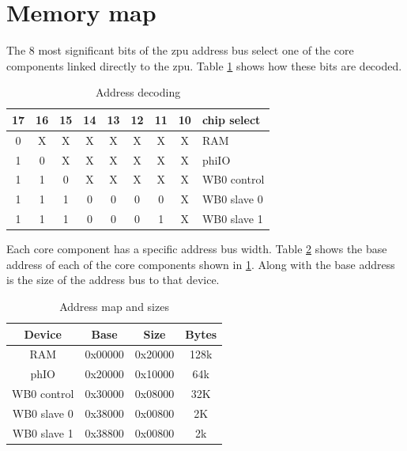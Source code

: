 \documentclass[a4paper,twocolumn,12pt]{article}
\begin{document}
\section{Memory map}

The 8 most significant bits of the zpu address bus select one of the core components linked directly to the zpu. Table \ref{tab:address_bits} shows how these bits are decoded.

\begin{table}[h]
\caption{Address decoding}
\label{tab:address_bits}
\begin{tabular}{| c | c | c | c | c | c | c | c | l |
}
    \hline
    17 & 16 & 15 & 14 & 13 & 12 & 11 & 10 & chip select \\ \hline
    0  & X  & X  & X  & X  & X  & X  & X  & RAM \\ \hline
    1  & 0  & X  & X  & X  & X  & X  & X  & phiIO \\ \hline
    1  & 1  & 0  & X  & X  & X  & X  & X  & WB0 control \\ \hline
    1  & 1  & 1  & 0  & 0  & 0  & 0  & X  & WB0 slave 0 \\ \hline
    1  & 1  & 1  & 0  & 0  & 0  & 1  & X  & WB0 slave 1 \\ \hline
\end{tabular}
\end{table}

Each core component has a specific address bus width. Table \ref{tab:address_map_hex} shows the base address of each of the core components shown in \ref{tab:address_bits}. Along with the base address is the size of the address bus to that device.

\begin{table}[h]
\caption{Address map and sizes}
\label{tab:address_map_hex}
\begin{tabular}{| c | c | c | c |
}
    \hline
    Device      & Base    & Size    & Bytes \\ \hline
    RAM         & 0x00000 & 0x20000 & 128k  \\ \hline
    phIO        & 0x20000 & 0x10000 & 64k   \\ \hline
    WB0 control & 0x30000 & 0x08000 & 32K   \\ \hline
    WB0 slave 0 & 0x38000 & 0x00800 & 2K    \\ \hline
    WB0 slave 1 & 0x38800 & 0x00800 & 2k    \\ \hline
\end{tabular}
\end{table}
\end{document}
